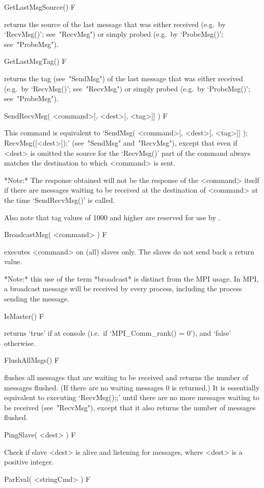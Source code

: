 \>GetLastMsgSource() F

returns the source of the last message that was either received  (e.g.~by
`RecvMsg()';  see~"RecvMsg")  or  simply  probed  (e.g.~by  `ProbeMsg()';
see~"ProbeMsg").

\>GetLastMsgTag() F

returns the tag (see~"SendMsg") of  the  last  message  that  was  either
received (e.g.~by `RecvMsg()'; see~"RecvMsg") or simply  probed  (e.g.~by
`ProbeMsg()'; see~"ProbeMsg").

\>SendRecvMsg( <command>[, <dest>[, <tag>]] ) F

This command is equivalent to `SendMsg( <command>[, <dest>[,  <tag>]]  );
RecvMsg([<dest>]);' (see~"SendMsg" and~"RecvMsg"), except  that  even  if
<dest> is omitted the source for the  `RecvMsg()'  part  of  the  command
always matches the destination to which <command> is sent.

*Note:*
The response obtained will not be the response of the <command> itself if
there are messages waiting to be received at the destination of <command>
at the time `SendRecvMsg()' is called.

Also note that tag values of 1000 and higher  are  reserved  for  use  by
{\ParGAP}.

\>BroadcastMsg( <command> ) F

executes <command> on (all) slaves only. The slaves do not  send  back  a
return value.

*Note:*
this use of the term *broadcast* is distinct from the MPI usage. In  MPI,
a broadcast message will be received  by  every  process,  including  the
process sending the message.

\>IsMaster() F

returns `true' if at console (i.e.~if `MPI_Comm_rank() = 0'), and `false'
otherwise.

\>FlushAllMsgs() F

flushes all messages that are waiting to  be  received  and  returns  the
number of messages flushed. (If  there  are  no  waiting  messages  0  is
returned.) It is essentially equivalent to executing `RecvMsg();;'  until
there are no more messages waiting to be received (see~"RecvMsg"), except
that it also returns the number of messages flushed.

\>PingSlave( <dest> ) F

Check if slave <dest> is alive and listening for messages,  where  <dest>
is a positive integer.

\>ParEval( <stringCmd> ) F

